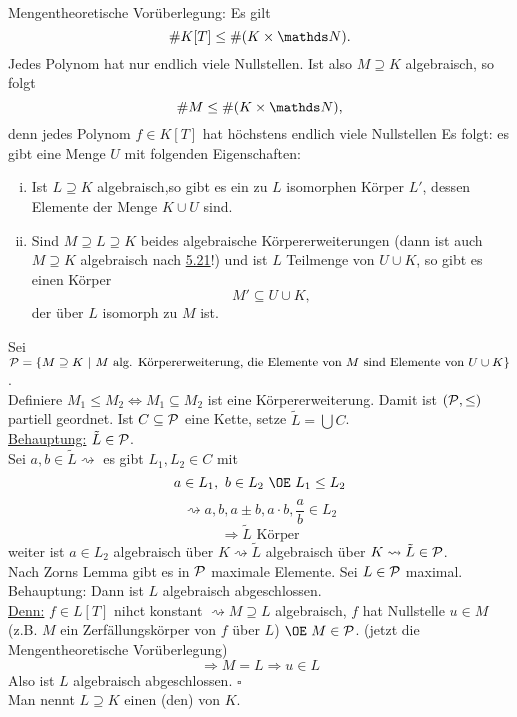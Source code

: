 \\
Mengentheoretische Vorüberlegung:
Es gilt
\[
\#K[T]\le \#(K\times \N).
\]
Jedes Polynom hat nur endlich viele Nullstellen.
Ist also $M\supseteq K$ algebraisch, so folgt
\[
\#M\le \#(K\times \N),
\]
denn jedes Polynom $f\in K[T]$ hat höchstens endlich viele Nullstellen
Es folgt:
es gibt eine Menge $U$ mit folgenden Eigenschaften:
\begin{enumerate}[(i)]
	\item Ist $L\supseteq K$ algebraisch,so gibt es ein zu $L$ isomorphen Körper $L'$, dessen Elemente der Menge $K\cup U$ sind.
	\item Sind $M\supseteq L\supseteq K$ beides algebraische Körpererweiterungen (dann ist auch $M\supseteq K$ algebraisch nach \hyperref[sub:alg_huelle]{5.21}!) und ist $L$ Teilmenge von $U\cup K$, so gibt es einen Körper
	\[
	M'\subseteq U\cup K,
	\] 
	der über $L$ isomorph zu $M$ ist.
\end{enumerate}

Sei $\mathcal{P}=\left\{M\supseteq K~|~M\text{ alg. Körpererweiterung, die Elemente von $M$ sind Elemente von }U\cup K\right\}$.\\
Definiere $M_1\le M_2 \Leftrightarrow M_1\subseteq M_2$ ist eine Körpererweiterung.
Damit ist $(\mathcal{P},\le)$ partiell geordnet.
Ist $C\subseteq \mathcal{P}$ eine Kette, setze $\tilde{L}=\bigcup C$.\\
\uline{Behauptung:} $\tilde{L}\in \mathcal{P}$.\\
Sei $a,b\in \tilde{L} \rightsquigarrow$ es gibt $L_1,L_2\in C$ mit
\[
a\in L_1,~b\in L_2 ~\OE~ L_1\le L_2
\]
\[
\rightsquigarrow a,b,a\pm b,a\cdot b,\frac{a}{b} \in L_2
\]
\[
\Rightarrow \tilde{L} \text{ Körper}
\]
weiter ist $a\in L_2$ algebraisch über $K\rightsquigarrow \tilde{L}$ algebraisch über $K\rightsquigarrow \tilde{L}\in \mathcal{P}$.\\
Nach Zorns Lemma gibt es in $\mathcal{P}$ maximale Elemente.
Sei $L\in \mathcal{P}$ maximal.
Behauptung: Dann ist $L$ algebraisch abgeschlossen.\\
\uline{Denn:}
$f\in L[T]$ nihct konstant $\rightsquigarrow M\supseteq L$ algebraisch, $f$ hat Nullstelle $u\in M$ (z.B. $M$ ein Zerfällungskörper von $f$ über $L$) $\OE~ M\in \mc{P}$.
(jetzt die Mengentheoretische Vorüberlegung)
\[
\Rightarrow M=L \Rightarrow u\in L
\]
Also ist $L$ algebraisch abgeschlossen.
\hfill $\square$\\

Man nennt $L\supseteq K$ einen (den)  von $K$.

